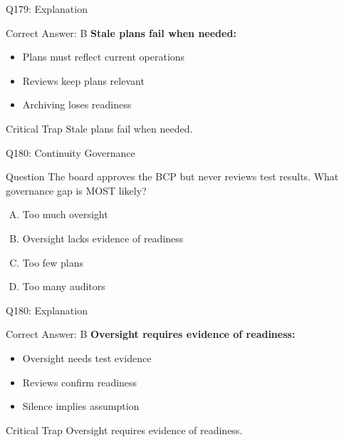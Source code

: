 \documentclass{beamer}
\begin{document}
	\begin{frame}{Q179: Explanation}
		\begin{block}{Correct Answer: B}
			\textbf{Stale plans fail when needed:}
			\begin{itemize}
				\item Plans must reflect current operations
				\item Reviews keep plans relevant
				\item Archiving loses readiness
			\end{itemize}
		\end{block}
		\begin{alertblock}{Critical Trap}
			Stale plans fail when needed.
		\end{alertblock}
	\end{frame}
	
	\begin{frame}{Q180: Continuity Governance}
		\begin{block}{Question}
			The board approves the BCP but never reviews test results. What governance gap is MOST likely?
		\end{block}
		\begin{enumerate}[(A)]
			\item Too much oversight
			\item Oversight lacks evidence of readiness
			\item Too few plans
			\item Too many auditors
		\end{enumerate}
	\end{frame}
	
	\begin{frame}{Q180: Explanation}
		\begin{block}{Correct Answer: B}
			\textbf{Oversight requires evidence of readiness:}
			\begin{itemize}
				\item Oversight needs test evidence
				\item Reviews confirm readiness
				\item Silence implies assumption
			\end{itemize}
		\end{block}
		\begin{alertblock}{Critical Trap}
			Oversight requires evidence of readiness.
		\end{alertblock}
	\end{frame}
	
\end{document}
